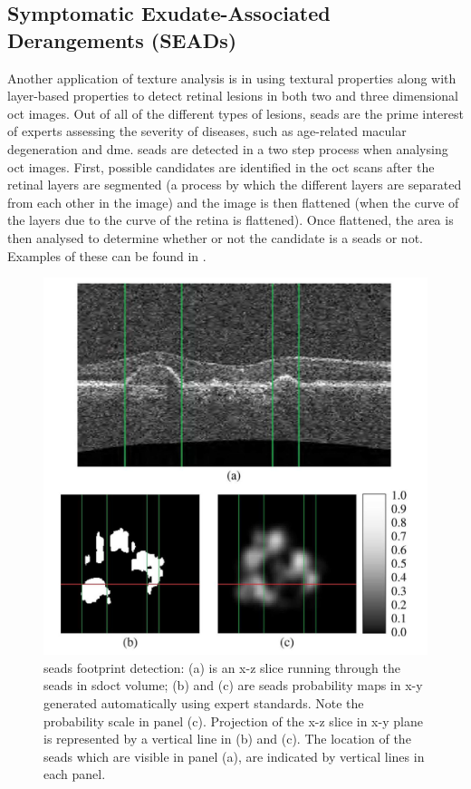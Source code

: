\subsection{Symptomatic Exudate-Associated Derangements (SEADs)}
Another application of texture analysis is in using textural properties along with
layer-based properties to detect retinal lesions in both two and three dimensional
\Gls{oct} images. Out of all of the different types of lesions, \Gls{seads} are the prime interest of
experts assessing the severity of diseases, such as age-related macular degeneration and \Gls{dme}.  \Gls{seads} are detected in a two step process when analysing \Gls{oct} images.  First, possible candidates are identified in the \Gls{oct} scans after the retinal layers are segmented (a process by which the different layers are separated from each other in the image) and the image is then flattened (when the curve of the layers due to the curve of the retina is flattened).  Once flattened, the area is then analysed to determine whether or not the candidate is a \Gls{seads} or not. 
\cite{mbib_4} Examples of these can be found in .

\begin{figure}[H]
\centering
\includegraphics{figures/morgan_7}
\caption{\Gls{seads} footprint detection: (a) is an x-z slice running through the \Gls{seads} in \Gls{sdoct} volume; (b) and (c) are \Gls{seads} probability maps in x-y generated automatically using expert standards.  Note the probability scale in panel (c). Projection of the x-z slice in x-y plane is represented by a vertical line in (b) and (c). The location of the \Gls{seads} which are visible in panel (a), are indicated by vertical lines in each panel. \cite{mbib_4} }
\label{fig:m_7}
\end{figure}

